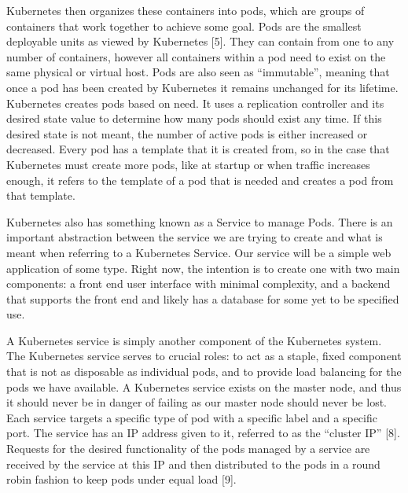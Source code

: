 \documentclass[thesis,proposal]{umassthesis}  %
\begin{document}
Kubernetes then organizes these containers into pods, which are groups of containers that work together to achieve some goal. Pods are the smallest deployable units as viewed by Kubernetes [5]. They can contain from one to any number of containers, however all containers within a pod need to exist on the same physical or virtual host. Pods are also seen as “immutable”, meaning that once a pod has been created by Kubernetes it remains unchanged for its lifetime. Kubernetes creates pods based on need. It uses a replication controller and its desired state value to determine how many pods should exist any time. If this desired state is not meant, the number of active pods is either increased or decreased. Every pod has a template that it is created from, so in the case that Kubernetes must create more pods, like at startup or when traffic increases enough, it refers to the template of a pod that is needed and creates a pod from that template.\par
Kubernetes also has something known as a Service to manage Pods. There is an important abstraction between the service we are trying to create and what is meant when referring to a Kubernetes Service. Our service will be a simple web application of some type. Right now, the intention is to create one with two main components: a front end user interface with minimal complexity, and a backend that supports the front end and likely has a database for some yet to be specified use.\par
A Kubernetes service is simply another component of the Kubernetes system. The Kubernetes service serves to crucial roles: to act as a staple, fixed component that is not as disposable as individual pods, and to provide load balancing for the pods we have available. A Kubernetes service exists on the master node, and thus it should never be in danger of failing as our master node should never be lost. Each service targets a specific type of pod with a specific label and a specific port. The service has an IP address given to it, referred to as the “cluster IP” [8]. Requests for the desired functionality of the pods managed by a service are received by the service at this IP and then distributed to the pods in a round robin fashion to keep pods under equal load [9].
\end{document}
